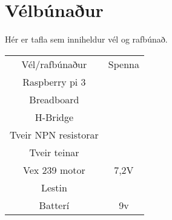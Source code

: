 \section{Vélbúnaður}
Hér er tafla sem inniheldur vél og rafbúnað.

\begin{center}
\begin{tabular}{ |c|c| } 
 \hline
 Vél/rafbúnaður &Spenna \\ 
 Raspberry pi 3 &\\ 
 Breadboard & \\
 H-Bridge & \\
 Tveir NPN resistorar & \\
 Tveir teinar & \\
 Vex 239 motor & 7,2V \\
 Lestin & \\
 Batterí & 9v \\
 \hline
\end{tabular}
\end{center}